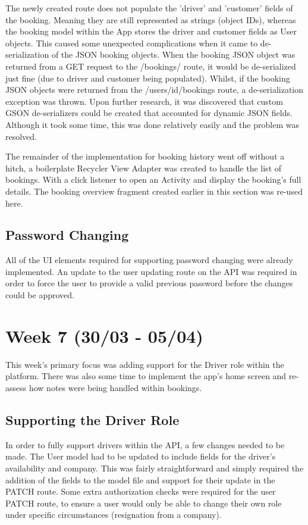 The newly created route does not populate the 'driver' and 'customer' fields of the booking. Meaning they are still represented as strings (object IDs), whereas the booking model within the App stores the driver and customer fields as User objects. This caused some unexpected complications when it came to de-serialization of the JSON booking objects. When the booking JSON object was returned from a GET request to the /bookings/ route, it would be de-serialized just fine (due to driver and customer being populated). Whilst, if the booking JSON objects were returned from the /users/{id}/bookings route, a de-serialization exception was thrown. Upon further research, it was discovered that custom GSON de-serializers could be created that accounted for dynamic JSON fields. Although it took some time, this was done relatively easily and the problem was resolved.

The remainder of the implementation for booking history went off without a hitch, a boilerplate Recycler View Adapter was created to handle the list of bookings. With a click listener to open an Activity and display the booking's full details. The booking overview fragment created earlier in this section was re-used here.

\subsection{Password Changing}
All of the UI elements required for supporting password changing were already implemented. An update to the user updating route on the API was required in order to force the user to provide a valid previous password before the changes could be approved.

\section{Week 7 (30/03 - 05/04)}
This week's primary focus was adding support for the Driver role within the platform. There was also some time to implement the app's home screen and re-assess how notes were being handled within bookings.

\subsection{Supporting the Driver Role}
In order to fully support drivers within the API, a few changes needed to be made. The User model had to be updated to include fields for the driver's availability and company. This was fairly straightforward and simply required the addition of the fields to the model file and support for their update in the PATCH route. Some extra authorization checks were required for the user PATCH route, to ensure a user would only be able to change their own role under specific circumstances (resignation from a company).

